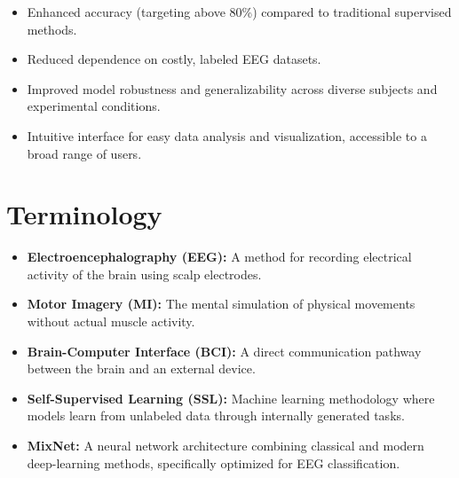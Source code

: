 \begin{itemize}

    \item Enhanced accuracy (targeting above 80\%) compared to traditional supervised methods.

    \item Reduced dependence on costly, labeled EEG datasets.

    \item Improved model robustness and generalizability across diverse subjects and experimental conditions.

    \item Intuitive interface for easy data analysis and visualization, accessible to a broad range of users.

\end{itemize}


\section{Terminology}
\label{section:terminology}


\begin{itemize}

    \item \textbf{Electroencephalography (EEG):} A method for recording electrical activity of the brain using scalp electrodes.

    \item \textbf{Motor Imagery (MI):} The mental simulation of physical movements without actual muscle activity.

    \item \textbf{Brain-Computer Interface (BCI):} A direct communication pathway between the brain and an external device.

    \item \textbf{Self-Supervised Learning (SSL):} Machine learning methodology where models learn from unlabeled data through internally generated tasks.

    \item \textbf{MixNet:} A neural network architecture combining classical and modern deep-learning methods, specifically optimized for EEG classification.

\end{itemize}
